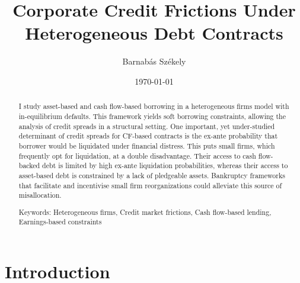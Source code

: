 \documentclass[12pt]{article}
\title{Corporate Credit Frictions Under Heterogeneous Debt Contracts}
\date{}
\begin{document}
\author{Barnabás Székely}
\date{\today}
\vspace{-1in}

\maketitle

\begin{abstract}
\noindent

I study asset-based and cash flow-based borrowing in a heterogeneous firms model with in-equilibrium defaults. This framework yields soft borrowing constraints, allowing the analysis of credit spreads in a structural setting. One important, yet under-studied determinant of credit spreads for CF-based contracts is the ex-ante probability that borrower would be liquidated under financial distress. This puts small firms, which frequently opt for liquidation, at a double disadvantage. Their access to cash flow-backed debt is limited by high ex-ante liquidation probabilities, whereas their access to asset-based debt is constrained by a lack of pledgeable assets. Bankruptcy frameworks that facilitate and incentivise small firm reorganizations could alleviate this source of misallocation. 

\bigskip{}
\bigskip{}

Keywords: Heterogeneous firms, Credit market frictions, Cash flow-based lending, Earnings-based constraints

\medskip{}
\end{abstract}
\thispagestyle{empty}

\pagebreak{}


\section{Introduction \label{sec:introduction}} 
\end{document}
